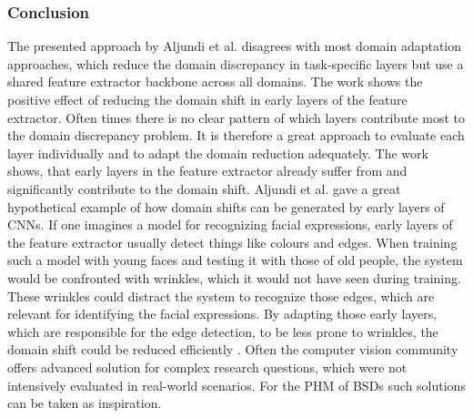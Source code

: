 \subsubsection{Conclusion}
The presented approach by Aljundi et al. \cite{Aljundi2016} disagrees with most domain adaptation approaches, which reduce the domain discrepancy in task-specific layers but use a shared feature extractor backbone across all domains. The work shows the positive effect of reducing the domain shift in early layers of the feature extractor. Often times there is no clear pattern of which layers contribute most to the domain discrepancy problem. It is therefore a great approach to evaluate each layer individually and to adapt the domain reduction adequately. The work shows, that early layers in the feature extractor already suffer from and significantly contribute to the domain shift. Aljundi et al. \cite{Aljundi2016} gave a great hypothetical example of how domain shifts can be generated by early layers of CNNs. If one imagines a model for recognizing facial expressions, early layers of the feature extractor usually detect things like colours and edges. When training such a model with young faces and testing it with those of old people, the system would be confronted with wrinkles, which it would not have seen during training. These wrinkles could distract the system to recognize those edges, which are relevant for identifying the facial expressions. By adapting those early layers, which are responsible for the edge detection, to be less prone to wrinkles, the domain shift could be reduced efficiently \cite{Aljundi2016}. Often the computer vision community offers advanced solution for complex research questions, which were not intensively evaluated in real-world scenarios. For the PHM of BSDs such solutions can be taken as inspiration. 

